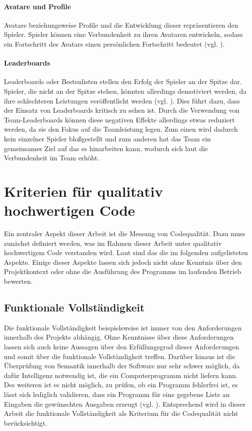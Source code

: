 \documentclass[
	oneside,  %
	ngerman, 
	final, 
	11pt, 
	a4paper, 
	1.1headlines, 
	headinclude=false, 
	footinclude=false, 
	mpinclude=false, 
	pagesize, 
	onecolumn, 
	titlepage, 
	parskip=half, 
	headsepline, 
	chapterprefix=false, 
	version=first, 
	listof=totoc, 
	bibliography=totoc, 
	toc=graduated, 
	fleqn
]{scrbook}
\begin{document}
\paragraph{Avatare und Profile}
Avatare beziehungsweise Profile und die Entwicklung dieser repräsentieren den Spieler.
Spieler können eine Verbundenheit zu ihren Avataren entwickeln, sodass ein Fortschritt des Avatars einen persönlichen Fortschritt bedeutet (vgl. \cite{SH2014}).

\paragraph{Leaderboards}
Leaderboards oder Bestenlisten stellen den Erfolg der Spieler an der Spitze dar.
Spieler, die nicht an der Spitze stehen, könnten allerdings demotiviert werden, da ihre schlechteren Leistungen veröffentlicht werden (vgl. \cite{SH2014}).
Dies führt dazu, dass der Einsatz von Leaderboards kritisch zu sehen ist.
Durch die Verwendung von Team-Leaderboards können diese negativen Effekte allerdings etwas reduziert werden, da sie den Fokus auf die Teamleistung legen.
Zum einen wird dadurch kein einzelner Spieler \glqq bloßgestellt \grqq{} und zum anderen hat das Team ein gemeinsames Ziel auf das es hinarbeiten kann, wodurch sich laut \cite{SH2014} die Verbundenheit im Team erhöht. 

\section{Kriterien für qualitativ hochwertigen Code}
\label{Kriterien_guter_Code}
Ein zentraler Aspekt dieser Arbeit ist die Messung von Codequalität.
Dazu muss zunächst definiert werden, was im Rahmen dieser Arbeit unter qualitativ hochwertigem Code verstanden wird.
Laut \cite{ISO-25010} sind das die im folgenden aufgelisteten Aspekte.
Einige dieser Aspekte lassen sich jedoch nicht ohne Kenntnis über den Projektkontext oder ohne die Ausführung des Programms im laufenden Betrieb bewerten.

\subsection{Funktionale Vollständigkeit}
Die funktionale Vollständigkeit beispielsweise ist immer von den Anforderungen innerhalb des Projekts abhängig.
Ohne Kenntnisse über diese Anforderungen lassen sich auch keine Aussagen über den Erfüllungsgrad dieser Anforderungen und somit über die funktionale Vollständigkeit treffen.
Darüber hinaus ist die Überprüfung von Semantik innerhalb der Software nur sehr schwer möglich, da dafür Intelligenz notwendig ist, die ein Computerprogramm nicht liefern kann.
Des weiteren ist es nicht möglich, zu prüfen, ob ein Programm fehlerfrei ist, es lässt sich lediglich validieren, dass ein Programm für eine gegebene Liste an Eingaben die gewünschten Ausgaben erzeugt (vgl. \cite{Di1972}).
Entsprechend wird in dieser Arbeit die funktionale Vollständigkeit als Kriterium für die Codequalität nicht berücksichtigt.
\end{document}
